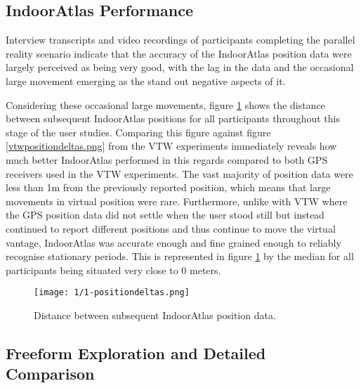 
\subsection{IndoorAtlas Performance}

Interview transcripts and video recordings of participants completing the parallel reality scenario indicate that the accuracy of the IndoorAtlas position data were largely perceived as being very good, with the lag in the data and the occasional large movement emerging as the stand out negative aspects of it.

Considering these occasional large movements, figure \ref{1-positiondeltas.png} shows the distance between subsequent IndoorAtlas positions for all participants throughout this stage of the user studies. Comparing this figure against figure \ref{vtwpositiondeltas.png} from the VTW experiments immediately reveals how much better IndoorAtlas performed in this regards compared to both GPS receivers used in the VTW experiments. The vast majority of position data were less than 1m from the previously reported position, which means that large movements in virtual position were rare. Furthermore, unlike with VTW where the GPS position data did not settle when the user stood still but instead continued to report different positions and thus continue to move the virtual vantage, IndoorAtlas was accurate enough and fine grained enough to reliably recognise stationary periods. This is represented in figure \ref{1-positiondeltas.png} by the median for all participants being situated very close to 0 meters.

\begin{figure}[ht]
	\begin{center}
		\texttt{[image: 1/1-positiondeltas.png]}
		\caption{Distance between subsequent IndoorAtlas position data.}
		\label{1-positiondeltas.png}
	\end{center}
\end{figure}


\subsection{Freeform Exploration and Detailed Comparison}

